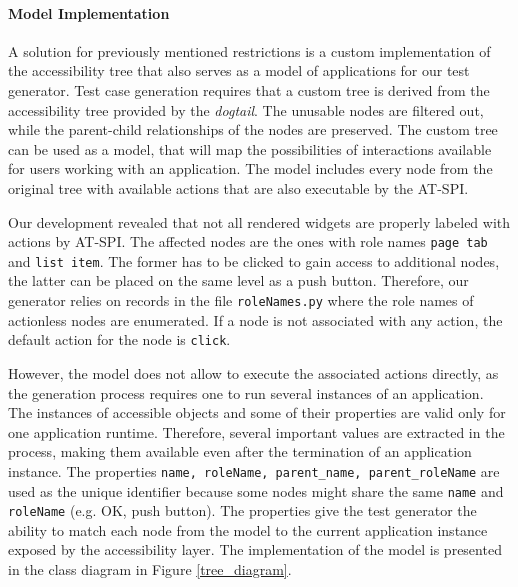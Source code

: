 \paragraph{Model Implementation} A solution for previously mentioned restrictions is a custom implementation of the accessibility tree that also serves as a model of applications for our test generator. Test case generation requires that a custom tree is derived from the accessibility tree provided by the \textit{dogtail}. The unusable nodes are filtered out, while the parent-child relationships of the nodes are preserved. The custom tree can be used as a model, that will map the possibilities of interactions available for users working with an application. The model includes every node from the original tree with available actions that are also executable by the AT-SPI.

Our development revealed that not all rendered widgets are properly labeled with actions by AT-SPI. The affected nodes are the ones with role names \texttt{page tab} and \texttt{list item}. The former has to be clicked to gain access to additional nodes, the latter can be placed on the same level as a push button. Therefore, our generator relies on records in the file \texttt{roleNames.py} where the role names of actionless nodes are enumerated. If a node is not associated with any action, the default action for the node is \texttt{click}.

However, the model does not allow to execute the associated actions directly, as the generation process requires one to run several instances of an application. The instances of accessible objects and some of their properties are valid only for one application runtime. Therefore, several important values are extracted in the process, making them available even after the termination of an application instance. The properties \texttt{name, roleName, parent\_name, parent\_roleName} are used as the unique identifier because some nodes might share the same \texttt{name} and \texttt{roleName} (e.g. OK, push button). The properties give the test generator the ability to match each node from the model to the current application instance exposed by the accessibility layer. The implementation of the model is presented in the class diagram in Figure \ref{tree_diagram}.


